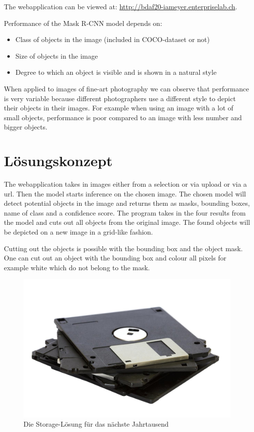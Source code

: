 \documentclass[a4paper,10pt,hidelinks]{scrartcl}
\begin{document}
\noindent
The webapplication can be viewed at: \url{http://bdaf20-iameyer.enterpriselab.ch}.

\noindent
Performance of the Mask R-CNN model depends on:

\begin{itemize}
	\item Class of objects in the image (included in COCO-dataset or not)
	\item Size of objects in the image
	\item Degree to which an object is visible and is shown in a natural style
\end{itemize}

\noindent
When applied to images of fine-art photography we can observe that performance is very variable because different photographers use a different style to depict their objects in their images. For example when using an image with a lot of small objects, performance is poor compared to an image with less number and bigger objects.

\section{\fontsize{14}{16}\selectfont Lösungskonzept}

The webapplication takes in images either from a selection or via upload or via a url. Then the model starts inference on the chosen image. The chosen model will detect potential objects in the image and returns them as masks, bounding boxes, name of class and a confidence score. \newline The program takes in the four results from the model and cuts out all objects from the original image. The found objects will be depicted on a new image in a grid-like fashion.

Cutting out the objects is possible with the bounding box and the object mask. One can cut out an object with the bounding box and colour all pixels for example white which do not belong to the mask.

\begin{figure}
    \centering
    \includegraphics[width=0.4\linewidth]{pics/storage-new.jpg}
    \caption{Die Storage-Lösung für das nächste Jahrtausend}
    \label{fig:storage-new}
\end{figure}
\end{document}
